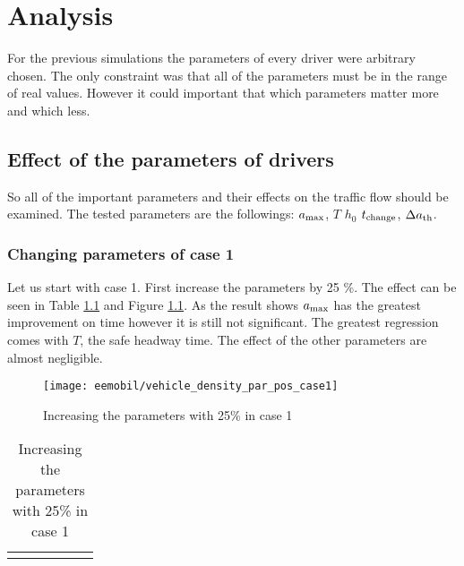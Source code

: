 \chapter{Analysis}
		For the previous simulations the parameters of every driver were arbitrary chosen. The only constraint was that all of the parameters must be in the range of real values. However it could important that which parameters matter more and which less.
	\section{Effect of the parameters of drivers}
		So all of the important parameters and their effects on the traffic flow should be examined. The tested parameters are the followings: $a_{\rm max}$, $T$ $h_0$ $t_{\rm change} $, $\Delta a_{\rm th}$.
		\subsection{Changing parameters of case 1}
		Let us start with case 1. First increase the parameters by 25 \%. The effect can be seen in Table \ref{tab:vehicle_density_par_pos_case_1} and Figure \ref{fig:vehicle_density_par_pos_case_1}. As the result shows $a_{\rm max}$ has the greatest improvement on time however it is still not significant. The greatest regression comes with $T$, the safe headway time. The effect of the other parameters are almost negligible.
		\begin{figure}[ht]
			\centering
			\texttt{[image: eemobil/vehicle\_density\_par\_pos\_case1]}
			\caption{Increasing the parameters with 25\% in case 1}
			\label{fig:vehicle_density_par_pos_case_1}
		\end{figure}
		\begin{table}[ht]
			\begin{center}
				\begin{tabular}{ |c|c|c|c|c|c|}
				\hline
				\vehicledensitypartable{1}
				\hline
				\end{tabular}
			\end{center}
			\caption{Increasing the parameters with 25\% in case 1}
			\label{tab:vehicle_density_par_pos_case_1}
		\end{table}
		
